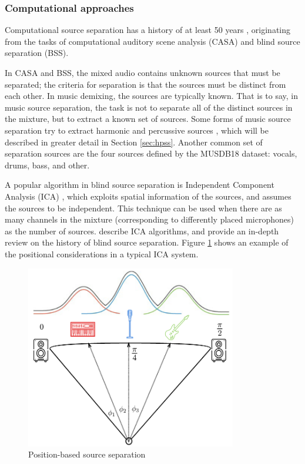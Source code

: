 \documentclass[report.tex]{subfiles}
\begin{document}
\subsubsection{Computational approaches}
\label{sec:musicsepbackground}

Computational source separation has a history of at least 50 years \parencite{musicmask, musicsepintro1}, originating from the tasks of computational auditory scene analysis (CASA) and blind source separation (BSS).


In CASA and BSS, the mixed audio contains unknown sources that must be separated; the criteria for separation is that the sources must be distinct from each other. In music demixing, the sources are typically known. That is to say, in music source separation, the task is not to separate all of the distinct sources in the mixture, but to extract a known set of sources. Some forms of music source separation try to extract harmonic and percussive sources \parencite{fitzgerald1, fitzgerald2, driedger}, which will be described in greater detail in Section \ref{sec:hpss}. Another common set of separation sources are the four sources defined by the MUSDB18 \parencite{musdb18} dataset: vocals, drums, bass, and other.

A popular algorithm in blind source separation is Independent Component Analysis (ICA)  \parencite{musicmask, musicsepgood, musicsepintro1}, which exploits spatial information of the sources, and assumes the sources to be independent. This technique can be used when there are as many channels in the mixture (corresponding to differently placed microphones) as the number of sources. \textcite{ica1, ica2} describe ICA algorithms, and \textcite{blind1, blind2} provide an in-depth review on the history of blind source separation. Figure \ref{fig:icaposition} shows an example of the positional considerations in a typical ICA system.

\begin{figure}[ht]
	\centering
	\includegraphics[height=8cm]{./images-mss/positional.png}
	\caption{Position-based source separation \parencite[35]{musicsepgood}}
\label{fig:icaposition}
\end{figure}
\end{document}
